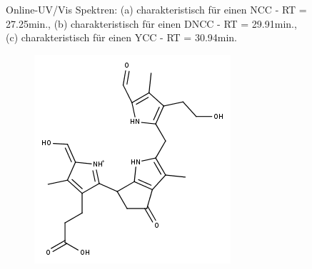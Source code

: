 \begin{figure}[!htbp]
\begin{subfigure}[b]{0.5\textwidth}
    \caption{}
    \label{fig:DNCC2991}
  \end{subfigure}
  \caption[Online-UV/Vis Spektren mit der Charakteristik eines NCC bei 27.10min., eines DNCC bei 29.75min. sowie eines YCC bei 30.94min., Quelle: Autor]{Online-UV/Vis Spektren: (a) charakteristisch für einen \gls{NCC} - RT = 27.25min., (b) charakteristisch für einen \gls{DNCC} - RT = 29.91min., (c) charakteristisch für einen \gls{YCC} - RT = 30.94min.}
\end{figure}

\begin{figure}[!htbp]
  \begin{subfigure}[b]{0.5\textwidth}
    \includegraphics[width=\textwidth]{figures/Kapitel7/Kataboliten/fragmentation_structures/VWA_Katabolit_647-CO2-RingD_480_MH_Enolform.png}
    \caption{}
    \label{fig:NCC2725}
  \end{subfigure}
  \hfill
  \begin{subfigure}[b]{0.5\textwidth}

\end{subfigure}
\end{figure}
